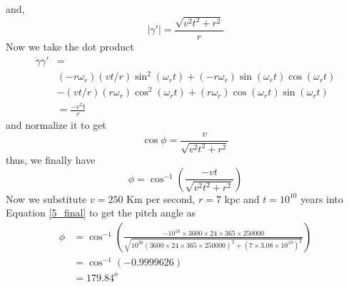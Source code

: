 \documentclass[paper=a4, fontsize=11pt]{scrartcl} %
\numberwithin{equation}{section} %
\numberwithin{figure}{section} %
\numberwithin{table}{section} %
\begin{document}
	and, 
	\begin{equation}
		\left|{\gamma'}\right| = \frac{\sqrt{v^2t^2 + r^2}}{r}
	\end{equation}
	Now we take the dot product
	\begin{equation}
	\begin{split}
		\dot\gamma\gamma' & = \\
		&(-r\omega_r)(vt/r) \sin^2 (\omega_r t) +(-r\omega_r)\sin(\omega_rt)\cos(\omega_rt) \\
		&- (vt/r)(r\omega_r)\cos^2(\omega_rt) + (r\omega_r)\cos(\omega_rt)\sin(\omega_rt) \\
		&= \frac{-v^2t}{r}
	\end{split}
	\end{equation}
	 and normalize it to get
	 \begin{equation}
	 	\cos\phi = \frac{v}{\sqrt{v^2t^2 + r^2}}
	 \end{equation}
	 thus, we finally have
	 \begin{equation}
	 	\phi = \cos^{-1} \left( \frac{-vt}{\sqrt{v^2t^2 + r^2}} \right)
	 	\label{5_final}
	 \end{equation}
	 Now we substitute $v=250$ Km per second, $r=7$ kpc and $t=10^{10}$ years into Equation \ref{5_final} to get the pitch angle as
	 \begin{equation}
	 \begin{split}
	 	\phi & =\cos^{-1} \left( \frac{-10^{10}\times 3600\times 24\times365\times250000}{\sqrt{10^{20}(3600\times 24\times365\times250000)^2 + (7\times 3.08\times 10^{19})^2}} \right)\\
	 	&=\cos^{-1}(-0.9999626) \\
	 	&=179.84^o
	 \end{split}
	 \end{equation}
\end{document}
